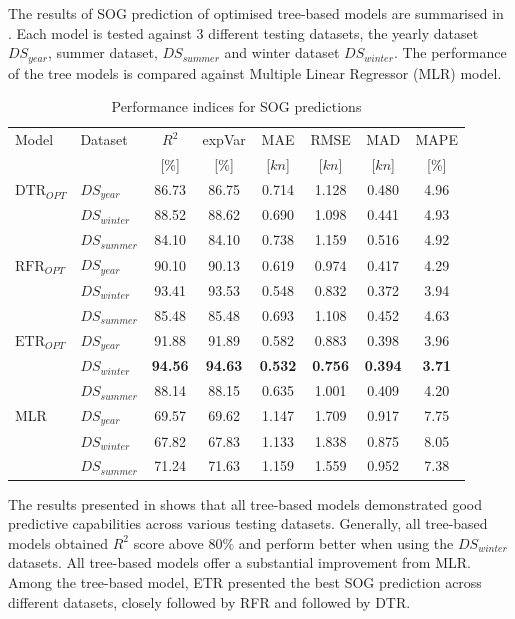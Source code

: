 The results of SOG prediction of optimised tree-based models are summarised in . Each model is tested against 3 different testing datasets, the yearly dataset $DS_{year}$, summer dataset, $DS_{summer}$ and winter dataset $DS_{winter}$. The performance of the tree models is compared against Multiple Linear Regressor (MLR) model.

\begin{table}[ht]
    \footnotesize
    \centering
    {\begin{tabular}{ l l c c c c c c }
    \hline
    Model & Dataset & $R^2$ & expVar & MAE & RMSE & MAD & MAPE \\
    & & [$\%$] & [$\%$] & [$kn$] & [$kn$] & [$kn$] & [$\%$]  \\ 
    \hline
    $\text{DTR}_{OPT}$ & $DS_{year}$ & 86.73 & 86.75 & 0.714 & 1.128  & 0.480 & 4.96  \\
    & $DS_{winter}$ & 88.52 & 88.62 & 0.690 & 1.098 & 0.441 & 4.93 \\
    & $DS_{summer}$ & 84.10 & 84.10 & 0.738 & 1.159 & 0.516 & 4.92 \\
    $\text{RFR}_{OPT}$ & $DS_{year}$  & 90.10 & 90.13 & 0.619 & 0.974 & 0.417 & 4.29 \\
    & $DS_{winter}$ & 93.41 & 93.53 & 0.548 & 0.832 & 0.372 & 3.94 \\
    & $DS_{summer}$ & 85.48 & 85.48 & 0.693 & 1.108 & 0.452 & 4.63 \\
    $\text{ETR}_{OPT}$ & $DS_{year}$ & 91.88 & 91.89 & 0.582 & 0.883 & 0.398 & 3.96 \\
    & $DS_{winter}$ & \textbf{94.56} & \textbf{94.63} & \textbf{0.532} & \textbf{0.756} & \textbf{0.394} & \textbf{3.71} \\
    & $DS_{summer}$ & 88.14 & 88.15 & 0.635 & 1.001 & 0.409 & 4.20 \\
    MLR & $DS_{year}$ & 69.57 & 69.62 & 1.147 & 1.709 & 0.917 & 7.75 \\
    & $DS_{winter}$ & 67.82 & 67.83 & 1.133 & 1.838 & 0.875 & 8.05 \\
    & $DS_{summer}$ & 71.24 & 71.63 & 1.159 & 1.559 & 0.952 & 7.38 \\
    \hline
    \end{tabular}}
\caption{Performance indices for SOG predictions}\label{tbl:testing_dataset_sog_result}
\end{table}

The results presented in  shows that all tree-based models demonstrated good predictive capabilities across various testing datasets. Generally, all tree-based models obtained $R^2$ score above $80\%$ and perform better when using the $DS_{winter}$ datasets. All tree-based models offer a substantial improvement from MLR. Among the tree-based model, ETR presented the best SOG prediction across different datasets, closely followed by RFR and followed by DTR.\\ 

